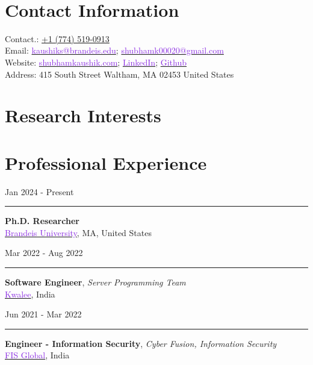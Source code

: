 \documentclass[10pt,a4paper,calibri]{moderncv}
\newcommand{\mediumspace}{\vspace{0.6em}}
\newcommand{\workexperience}[2]{
  \noindent
  \begin{minipage}[c]{0.20\textwidth}
    \begin{flushright}
      #1
    \end{flushright}
  \end{minipage}%
  \hspace{0.01\textwidth}
  \begin{minipage}[c]{0.02\textwidth}
    \textcolor{lightgray}{\rule{1pt}{0.7cm}}
  \end{minipage}%
  \begin{minipage}[c]{0.80\textwidth}
    \raggedright{
      #2
    }
  \end{minipage}%
}
\begin{document}
\makecvtitle\

\vspace{-50pt}
\section{Contact Information}
Contact.: \href{tel:+17745190913}{+1 (774) 519-0913}\\ Email:
\href{mailto:kaushiks@brandeis.edu}{\textcolor{blueviolet}{kaushiks@brandeis.edu}}\;;
\href{mailto:shubhamk00020@gmail.com}{\textcolor{blueviolet}{shubhamk00020@gmail.com}}\\
Website:
\href{https://www.shubhamkaushik.com}{\textcolor{blueviolet}{shubhamkaushik.com}}\;;
\href{https://www.linkedin.com/in/shubham-sudo}{\textcolor{blueviolet}{LinkedIn}}\;;
\href{https://www.github.com/shubham-sudo}{\textcolor{blueviolet}{Github}}\\
Address: 415 South Street Waltham, MA 02453 United States

\section{Research Interests}


\section{Professional Experience}
\workexperience{Jan 2024 \-- Present}{
	\textbf{Ph.D. Researcher}\\
	\href{https://www.brandeis.edu/}{\textcolor{blueviolet}{Brandeis University}}, MA, United States\\
}

\mediumspace

\workexperience{Mar 2022 \-- Aug 2022}{
	\textbf{Software Engineer}, \textit{Server Programming Team}\\
	\href{https://www.kwalee.com/}{\textcolor{blueviolet}{Kwalee}}, India\\
}

\mediumspace

\workexperience{Jun 2021 \-- Mar 2022}{
	\textbf{Engineer \-- Information Security}, \textit{Cyber Fusion, Information Security}\\
	\href{https://www.fisglobal.com/en}{\textcolor{blueviolet}{FIS Global}}, India\\
}

\mediumspace
\end{document}
